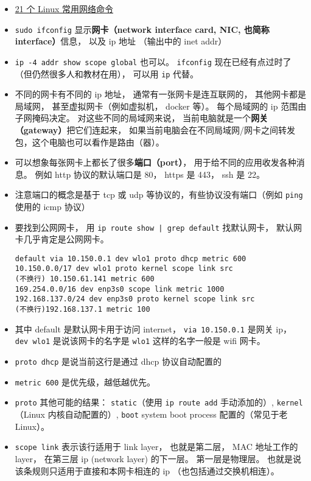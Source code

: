 
\begin{itemize}
\item \href{https://itsfoss.com/basic-linux-networking-commands/}{21 个 Linux 常用网络命令}
\item \verb`sudo ifconfig` 显示\textbf{网卡（network interface card, NIC, 也简称 interface）}信息， 以及 ip 地址 （输出中的 inet addr）
\item \verb|ip -4 addr show scope global| 也可以。 \verb|ifconfig| 现在已经有点过时了（但仍然很多人和教材在用）， 可以用 \verb|ip| 代替。
\item 不同的网卡有不同的 ip 地址， 通常有一张网卡是连互联网的， 其他网卡都是局域网， 甚至虚拟网卡（例如虚拟机， docker 等）。 每个局域网的 ip 范围由子网掩码决定。 对这些不同的局域网来说， 当前电脑就是一个\textbf{网关（gateway）}把它们连起来， 如果当前电脑会在不同局域网/网卡之间转发包，这个电脑也可以看作是路由（器）。
\item 可以想象每张网卡上都长了很多\textbf{端口（port）}， 用于给不同的应用收发各种消息。 例如 http 协议的默认端口是 80， https 是 443， ssh 是 22。
\item 注意端口的概念是基于 tcp 或 udp 等协议的，有些协议没有端口（例如 \verb`ping` 使用的 icmp 协议）
\item 要找到公网网卡， 用 \verb`ip route show | grep default` 找默认网卡， 默认网卡几乎肯定是公网网卡。
\begin{lstlisting}[language=none]
default via 10.150.0.1 dev wlo1 proto dhcp metric 600
10.150.0.0/17 dev wlo1 proto kernel scope link src
(不换行) 10.150.61.141 metric 600
169.254.0.0/16 dev enp3s0 scope link metric 1000
192.168.137.0/24 dev enp3s0 proto kernel scope link src
(不换行)192.168.137.1 metric 100
\end{lstlisting}
\item 其中 default 是默认网卡用于访问 internet， \verb`via 10.150.0.1` 是网关 ip， \verb`dev wlo1` 是说该网卡的名字是 \verb`wlo1` 这样的名字一般是 wifi 网卡。
\item \verb`proto dhcp` 是说当前这行是通过 dhcp 协议自动配置的
\item \verb`metric 600` 是优先级，越低越优先。
\item \verb`proto` 其他可能的结果： \verb`static`（使用 \verb`ip route add` 手动添加的）, \verb`kernel`（Linux 内核自动配置的）, \verb`boot` system boot process 配置的（常见于老 Linux）。
\item \verb`scope link` 表示该行适用于 link layer， 也就是第二层， MAC 地址工作的 layer， 在第三层 ip (network layer) 的下一层。 第一层是物理层。 也就是说该条规则只适用于直接和本网卡相连的 ip （也包括通过交换机相连）。

\end{itemize}
